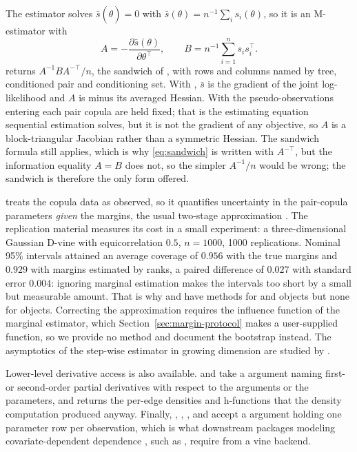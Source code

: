\documentclass[article]{jss}
\begin{document}
The estimator solves $\bar{s}(\hat\theta) = 0$ with
$\bar{s}(\theta) = n^{-1} \sum_i s_i(\theta)$, so it is an M-estimator with
\begin{equation}\label{eq:sandwich}
  A = -\frac{\partial \bar{s}(\theta)}{\partial \theta^\top},
  \qquad
  B = n^{-1} \sum_{i=1}^n s_i s_i^\top .
\end{equation}
 returns $A^{-1} B A^{-\top} / n$, the sandwich of
\citet{white1982}, with rows and columns named by tree, conditioned pair and
conditioning set.  With , $\bar{s}$ is the gradient
of the joint log-likelihood and $A$ is minus its averaged Hessian.  With
 the pseudo-observations entering each pair copula
are held fixed; that is the estimating equation sequential estimation solves,
but it is not the gradient of any objective, so $A$ is a block-triangular
Jacobian rather than a symmetric Hessian.  The sandwich formula still
applies, which is why \eqref{eq:sandwich} is written with $A^{-\top}$, but
the information equality $A = B$ does not, so the simpler $A^{-1}/n$ would be
wrong; the sandwich is therefore the only form offered.

 treats the copula data as observed, so it quantifies uncertainty
in the pair-copula parameters \emph{given} the margins, the usual two-stage
approximation \citep{joe2005, ko2019}.  The replication material measures its
cost in a small experiment: a three-dimensional Gaussian D-vine with
equicorrelation $0.5$, $n = 1000$, 1000 replications.  Nominal 95\% intervals
attained an average coverage of $0.956$ with the true margins and $0.929$
with margins estimated by ranks, a paired difference of $0.027$ with standard
error $0.004$: ignoring marginal estimation makes the intervals too short by
a small but measurable amount.  That is why  and
 have methods for  and  objects but
none for  objects.  Correcting the approximation requires the
influence function of the marginal estimator, which
Section~\ref{sec:margin-protocol} makes a user-supplied function, so we
provide no method and document the bootstrap instead.  The asymptotics of the
step-wise estimator in growing dimension are studied by \citet{gauss2025}.

Lower-level derivative access is also available.   and  take a 
argument naming first- or second-order partial derivatives with respect to the
arguments or the parameters, and  returns the
per-edge densities and h-functions that the density computation produced
anyway.  Finally, , , ,  and
 accept a  argument holding one parameter row
per observation, which is what downstream packages modeling covariate-dependent
dependence \citep{vatter2015, vatter2018}, such as 
\citep{gamCopula}, require from a vine backend.
\end{document}
